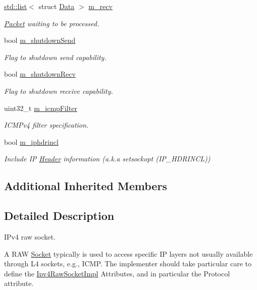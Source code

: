\begin{DoxyCompactItemize}
\hyperlink{openflow-interface_8h_afd9bcfa176617760671b67580f536fa7}{std\+::list}$<$ struct \hyperlink{structns3_1_1Ipv4RawSocketImpl_1_1Data}{Data} $>$ \hyperlink{classns3_1_1Ipv4RawSocketImpl_a460de0afa7bc2d11b5e54cf23e361173}{m\+\_\+recv}
\begin{DoxyCompactList}\small\item\em \hyperlink{classns3_1_1Packet}{Packet} waiting to be processed. \end{DoxyCompactList}\item 
bool \hyperlink{classns3_1_1Ipv4RawSocketImpl_adc89037fdb02fa149e063882c499dfb8}{m\+\_\+shutdown\+Send}
\begin{DoxyCompactList}\small\item\em Flag to shutdown send capability. \end{DoxyCompactList}\item 
bool \hyperlink{classns3_1_1Ipv4RawSocketImpl_abb193a17208627ab4f74a9a95e0ef6e9}{m\+\_\+shutdown\+Recv}
\begin{DoxyCompactList}\small\item\em Flag to shutdown receive capability. \end{DoxyCompactList}\item 
uint32\+\_\+t \hyperlink{classns3_1_1Ipv4RawSocketImpl_ab80bb1194c37a7489b342156a7bfcb92}{m\+\_\+icmp\+Filter}
\begin{DoxyCompactList}\small\item\em I\+C\+M\+Pv4 filter specification. \end{DoxyCompactList}\item 
bool \hyperlink{classns3_1_1Ipv4RawSocketImpl_a895d0929c6fb2c111f99e83a8b7516fc}{m\+\_\+iphdrincl}
\begin{DoxyCompactList}\small\item\em Include IP \hyperlink{classns3_1_1Header}{Header} information (a.\+k.\+a setsockopt (I\+P\+\_\+\+H\+D\+R\+I\+N\+CL)) \end{DoxyCompactList}\end{DoxyCompactItemize}
\subsection*{Additional Inherited Members}


\subsection{Detailed Description}
I\+Pv4 raw socket. 

A R\+AW \hyperlink{classns3_1_1Socket}{Socket} typically is used to access specific IP layers not usually available through L4 sockets, e.\+g., I\+C\+MP. The implementer should take particular care to define the \hyperlink{classns3_1_1Ipv4RawSocketImpl}{Ipv4\+Raw\+Socket\+Impl} Attributes, and in particular the Protocol attribute. 

